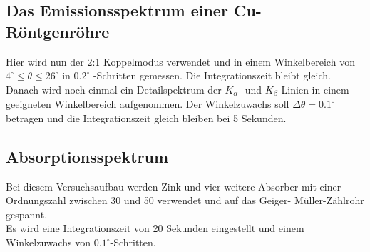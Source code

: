 \subsection{Das Emissionsspektrum einer Cu-Röntgenröhre}

Hier wird nun der 2:1 Koppelmodus verwendet und in einem Winkelbereich
von $ 4 ^\circ \leq \theta \leq 26 ^\circ$ in $0.2 ^\circ$
-Schritten gemessen. Die Integrationszeit bleibt gleich.\\
Danach wird noch einmal ein Detailspektrum der $K_{\alpha}$- und $K_{\beta}$-Linien
in einem geeigneten Winkelbereich aufgenommen. Der Winkelzuwachs soll $\Delta \theta = 0.1 ^\circ$
betragen und die Integrationszeit gleich bleiben bei 5 Sekunden.\\

\subsection{Absorptionsspektrum}

Bei diesem Versuchsaufbau werden Zink und vier weitere Absorber
mit einer Ordnungszahl zwischen 30 und 50 verwendet und auf das Geiger-
Müller-Zählrohr gespannt.\\
Es wird eine Integrationszeit von 20 Sekunden eingestellt und einem Winkelzuwachs
von $0.1 ^\circ$-Schritten.
